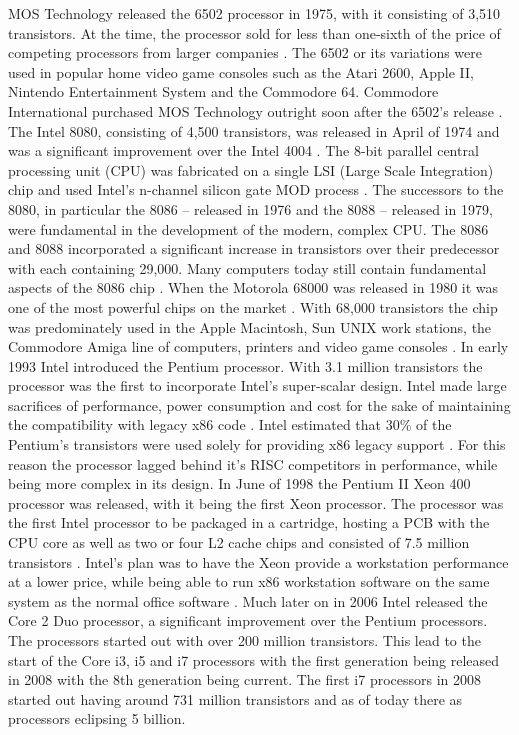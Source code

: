 MOS Technology released the 6502 processor in 1975, with it consisting of 3,510 transistors.
At the time, the processor sold for less than one-sixth of the price of competing processors from larger companies \cite{RN29}.
The 6502 or its variations were used in popular home video game consoles such as the Atari 2600, Apple II, Nintendo Entertainment System and the Commodore 64.
Commodore International purchased MOS Technology outright soon after the 6502’s release \cite{RN29}.
The Intel 8080, consisting of 4,500 transistors, was released in April of 1974 and was a significant improvement over the Intel 4004 \cite{RN8}.
The 8-bit parallel central processing unit (CPU) was fabricated on a single LSI (Large Scale Integration) chip and used Intel’s n-channel silicon gate MOD process \cite{RN10}.
The successors to the 8080, in particular the 8086 – released in 1976 and the 8088 – released in 1979, were fundamental in the development of the modern, complex CPU.
The 8086 and 8088 incorporated a significant increase in transistors over their predecessor with each containing 29,000.
Many computers today still contain fundamental aspects of the 8086 chip \cite{RN11}.  
When the Motorola 68000 was released in 1980 it was one of the most powerful chips on the market \cite{RN18}.
With 68,000 transistors the chip was predominately used in the Apple Macintosh, Sun UNIX work stations, the Commodore Amiga line of computers, printers and video game consoles \cite{RN18}. 
In early 1993 Intel introduced the Pentium processor.
With 3.1 million transistors  \cite{RN13, Intel4584:online} the processor was the first to incorporate Intel’s super-scalar design.
Intel made large sacrifices of performance, power consumption and cost for the sake of maintaining the compatibility with legacy x86 code \cite{RN13}.
Intel estimated that 30\% of the Pentium’s transistors were used solely for providing x86 legacy support \cite{RN7}.
For this reason the processor lagged behind it’s RISC competitors in performance, while being more complex in its design.
In June of 1998 the Pentium II Xeon 400 processor was released, with it being the first Xeon processor.
The processor was the first Intel processor to be packaged in a cartridge, hosting a PCB with the CPU core as well as two or four L2 cache chips \cite{RN12} and consisted of 7.5 million transistors \cite{RN19}.
Intel’s plan was to have the Xeon provide a workstation performance at a lower price, while being able to run x86 workstation software on the same system as the normal office software \cite{RN12}.
Much later on in 2006 Intel released the Core 2 Duo processor, a significant improvement over the Pentium processors.
The processors started out with over 200 million transistors. 
This lead to the start of the Core i3, i5 and i7 processors with the first generation being released in 2008 with the 8th generation being current.
The first i7 processors in 2008 started out having around 731 million transistors and as of today there as processors eclipsing 5 billion.  

